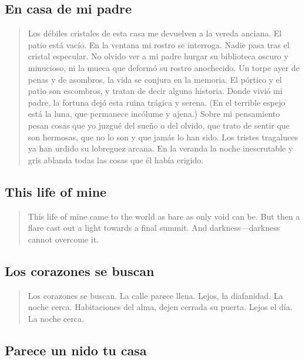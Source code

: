 \documentclass[a4paper, 12pt]{article}
\begin{document}
\pagebreak
\subsection{En casa de mi padre}

\begin{verse}
   Los débiles cristales de esta casa 
   me devuelven a la vereda anciana.
   El patio está vacío. En la ventana 
   mi rostro se interroga. Nadie pasa 
   tras el cristal especular. No olvido 
   ver a mi padre hurgar su biblioteca
   oscuro y minucioso, ni la mueca 
   que deformó su rostro anochecido.
   Un torpe ayer de penas y de asombros,
   la vida se conjura en la memoria.
   El pórtico y el patio son escombros,
   y tratan de decir alguna historia.
   Donde vivió mi padre, la fortuna 
   dejó esta ruina trágica y serena.
   (En el terrible espejo está la luna,
   que permanece incólume y ajena.)
   Sobre mi pensamiento pesan cosas 
   que yo juzgué del sueño o del olvido,
   que trato de sentir que son hermosas,
   que no lo son y que jamás lo han sido.
   Los tristes tragaluces ya han urdido
   su lobreguez arcana. En la veranda 
   la noche inescrutable y gris ablanda 
   todas las cosas que él había erigido.
\end{verse}



\pagebreak

\subsection{This life of mine}

\begin{verse}
    This life of mine came to the world as bare
    as only void can be. But then a flare
    cast out a light towards a final summit.
    And darkness—darkness cannot overcome it.
\end{verse}


\pagebreak 
\subsection{Los corazones se buscan}

\begin{verse}
    
Los corazones se buscan.
La calle parece llena.
Lejos, la diafanidad.
La noche cerca.
Habitaciones del alma,
dejen cerrada su puerta.
Lejos el día.
La noche cerca.
\end{verse}

\pagebreak
\subsection{Parece un nido tu casa}
\end{document}
